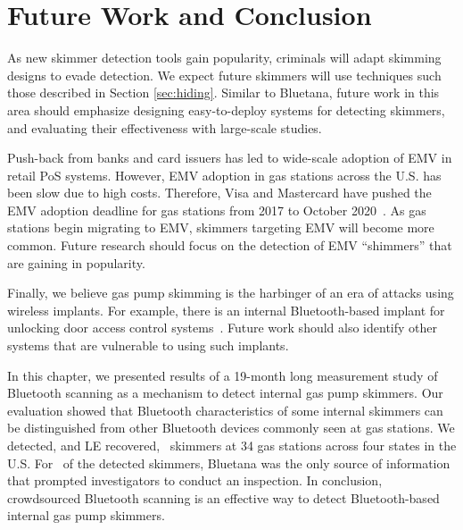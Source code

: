 \section{Future Work and Conclusion}
\label{sec:conclusion}

As new skimmer detection tools gain popularity, criminals will adapt skimming designs to evade detection.
%
We expect future skimmers will use techniques such those described in Section \ref{sec:hiding}.
%
Similar to Bluetana, future work in this area should emphasize designing easy-to-deploy systems for detecting
skimmers, and evaluating their effectiveness with large-scale studies.

Push-back from banks and card issuers has led to wide-scale adoption of EMV in
retail PoS systems. 
%
However, EMV adoption in gas stations across the U.S. has been slow due to high
costs.
%
Therefore, Visa and Mastercard have pushed the EMV adoption deadline for gas
stations from 2017 to October 2020~\cite{emv2020}. 
%
As gas stations begin migrating to EMV, skimmers targeting EMV will become more
common. 
%
Future research should focus on the detection of EMV ``shimmers'' that are
gaining in popularity.

Finally, we believe gas pump skimming is the harbinger of an era of attacks
using wireless implants. 
%
For example, there is an internal Bluetooth-based implant for unlocking door
access control systems~\cite{blekey}. 
%
Future work should also identify other
systems that are vulnerable to using such implants.

In this chapter, we presented results of a 19-month long measurement study of
Bluetooth scanning as a mechanism to detect internal gas pump skimmers. 
%
Our evaluation showed that Bluetooth characteristics of some internal skimmers
can be distinguished from other Bluetooth devices commonly seen at gas
stations. 
%
We detected, and LE recovered, \totalskimmers~skimmers at 34 gas
stations across four states in the U.S. 
%
For \totalskimmersBluetana~of the detected skimmers, Bluetana was the only
source of information that prompted investigators to conduct an inspection.
%
In conclusion, crowdsourced Bluetooth scanning is an effective way to detect
Bluetooth-based internal gas pump skimmers.

\begin{comment}
This paper presented Bluetana, a empirical measurement study of Bluetooth's ability to detect internal
card skimmers. Bluetooth makes it possible to quickly and accurately detect skimmers within gas dispensers.
Our evaluation has shown that Bluetooth is a promising method of skimmer detection, capable of
detecting ~\totalskimmers~ skimmers for a \emph{daily} monetary impact of ~\Bluetanafraudprevented~ dollars in a study of ~\visitedgasstations~ stations.
\end{comment}

